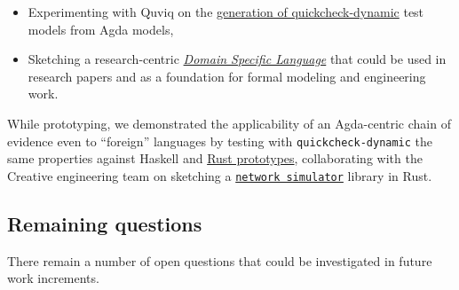 \documentclass[10pt]{article}
\providecommand{\tightlist}{%
  \setlength{\itemsep}{0pt}\setlength{\parskip}{0pt}}
\begin{document}
\begin{itemize}
\tightlist
\item
  Experimenting with Quviq on the
  \hyperref[relating-test-model-to-formal-model]{generation of
  quickcheck-dynamic} test models from Agda models,
\item
  Sketching a research-centric \hyperref[pseudo-code]{\emph{Domain
  Specific Language}} that could be used in research papers and as a
  foundation for formal modeling and engineering work.
\end{itemize}

While prototyping, we demonstrated the applicability of an Agda-centric
chain of evidence even to ``foreign'' languages by testing with
\texttt{quickcheck-dynamic} the same properties against Haskell and
\hyperref[rust-based-simulation]{Rust prototypes}, collaborating with
the Creative engineering team on sketching a
\href{https://github.com/input-output-hk/ce-netsim}{\color{blue}\texttt{network simulator}}
library in Rust.

\subsection{Remaining questions}\label{remaining-questions}

There remain a number of open questions that could be investigated in
future work increments.
\end{document}
